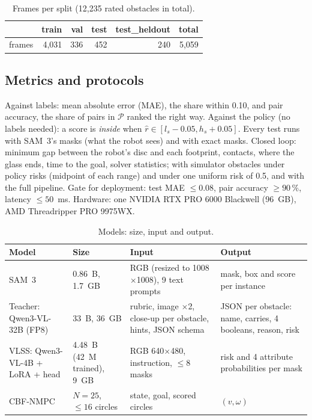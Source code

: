 \documentclass[10pt,a4paper]{article}
\begin{document}
\begin{table}[htbp]
\centering\small
\caption{Frames per split (12{,}235 rated obstacles in total).}
\label{tab:splits}
\begin{tabular}{lrrrrr}
\toprule
 & train & val & test & test\_heldout & total \\
\midrule
frames & 4{,}031 & 336 & 452 & 240 & 5{,}059 \\
\bottomrule
\end{tabular}
\end{table}

\subsection{Metrics and protocols}
Against labels: mean absolute error (MAE), the share within 0.10, and pair accuracy, the share of pairs in $\mathcal P$ ranked the right
way. Against the policy (no labels needed): a score is \emph{inside} when $\hat r\in[l_s-0.05,h_s+0.05]$. Every test runs with SAM~3's
masks (what the robot sees) and with exact masks. Closed loop: minimum gap between the robot's disc and each footprint, contacts,
where the glass ends, time to the goal, solver statistics; with simulator obstacles under policy risks (midpoint of each range) and
under one uniform risk of 0.5, and with the full pipeline. Gate for deployment: test MAE $\leq0.08$, pair accuracy $\geq90\,\%$,
latency $\leq50$~ms. Hardware: one NVIDIA RTX PRO 6000 Blackwell (96~GB), AMD Threadripper PRO 9975WX.

\begin{table}[htbp]
\centering\small
\caption{Models: size, input and output.}
\label{tab:models}
\begin{tabularx}{\textwidth}{>{\raggedright}p{2.6cm}>{\raggedright}p{2.3cm}>{\raggedright}X>{\raggedright\arraybackslash}p{4.2cm}}
\toprule
Model & Size & Input & Output \\
\midrule
SAM~3 & 0.86~B, 1.7~GB & RGB (resized to 1008$\times$1008), 9 text prompts & mask, box and score per instance \\
Teacher: Qwen3-VL-32B (FP8) & 33~B, 36~GB & rubric, image $\times$2, close-up per obstacle, hints, JSON schema & JSON per obstacle: name, carries, 4 booleans, reason, risk \\
VLSS: Qwen3-VL-4B + LoRA + head & 4.48~B (42~M trained), 9~GB & RGB 640$\times$480, instruction, $\leq8$ masks & risk and 4 attribute probabilities per mask \\
CBF-NMPC & $N=25$, $\leq16$ circles & state, goal, scored circles & $(v,\omega)$ \\
\bottomrule
\end{tabularx}
\end{table}
\end{document}
